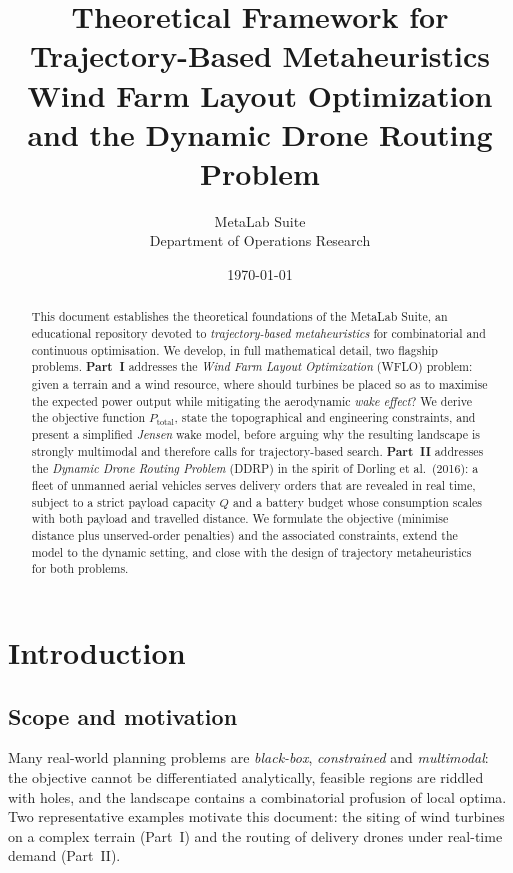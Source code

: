 \documentclass[11pt,a4paper]{article}
\title{%
  \textbf{Theoretical Framework for Trajectory-Based Metaheuristics}\\[3mm]
  \large Wind Farm Layout Optimization and the Dynamic Drone Routing Problem}
\author{%
  MetaLab Suite\\[1mm]
  \small Department of Operations Research}
\date{\today}
\begin{document}
\maketitle

\begin{abstract}
\noindent
This document establishes the theoretical foundations of the MetaLab Suite, an
educational repository devoted to \emph{trajectory-based metaheuristics} for
combinatorial and continuous optimisation. We develop, in full mathematical
detail, two flagship problems. \textbf{Part~I} addresses the
\emph{Wind Farm Layout Optimization} (WFLO) problem: given a terrain and a wind
resource, where should turbines be placed so as to maximise the expected power
output while mitigating the aerodynamic \emph{wake effect}? We derive the
objective function $P_{\text{total}}$, state the topographical and engineering
constraints, and present a simplified \emph{Jensen} wake model, before arguing
why the resulting landscape is strongly multimodal and therefore calls for
trajectory-based search. \textbf{Part~II} addresses the \emph{Dynamic Drone
Routing Problem} (DDRP) in the spirit of Dorling et al.~(2016): a fleet of
unmanned aerial vehicles serves delivery orders that are revealed in real time,
subject to a strict payload capacity $Q$ and a battery budget whose consumption
scales with both payload and travelled distance. We formulate the objective
(minimise distance plus unserved-order penalties) and the associated
constraints, extend the model to the dynamic setting, and close with the design
of trajectory metaheuristics for both problems.
\end{abstract}

\tableofcontents
\bigskip

\section{Introduction}

\subsection{Scope and motivation}

Many real-world planning problems are \emph{black-box}, \emph{constrained} and
\emph{multimodal}: the objective cannot be differentiated analytically, feasible
regions are riddled with holes, and the landscape contains a combinatorial
profusion of local optima. Two representative examples motivate this document:
the siting of wind turbines on a complex terrain (Part~I) and the routing of
delivery drones under real-time demand (Part~II).
\end{document}
